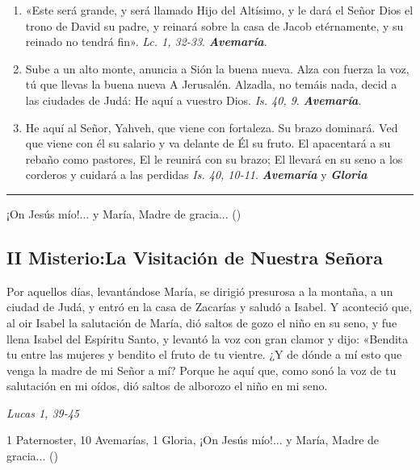 \documentclass[11pt,a4paper]{book}
\begin{document}
\begin{enumerate}
        \item «Este será grande, y será llamado Hijo del Altísimo, y le dará el Señor Dios el trono de David su padre, 
                y reinará sobre la casa de Jacob etérnamente, y su reinado no tendrá fin».  \emph{Lc. 1, 32-33}. \textbf{\emph{Avemaría}}.

        \item Sube a un alto monte, anuncia a Sión la buena nueva. Alza con fuerza la voz, tú que llevas la buena nueva A Jerusalén. Alzadla, no temáis nada, decid a las ciudades de Judá:
                He aquí a vuestro Dios. \emph{Is. 40, 9}. \textbf{\emph{Avemaría}}.

        \item He aquí al Señor, Yahveh, que viene con fortaleza. Su brazo dominará. Ved que viene con él su salario y va delante de Él su fruto. El apacentará a su rebaño como pastores,
                El le reunirá con su brazo; El llevará en su seno a los corderos y cuidará a las perdidas \emph{Is. 40, 10-11}. 
                \textbf{\emph{Avemaría}} y \textbf{\emph{Gloria}}
    \end{enumerate}

    \rule{\textwidth}{0.5pt}
    ¡On Jesús mío!... y María, Madre de gracia... ()

    \subsection*{II Misterio:La Visitación de Nuestra Señora}

    Por aquellos días, levantándose María, se dirigió presurosa a la montaña, a un ciudad de Judá, y entró en la casa de Zacarías y saludó a Isabel. 
    Y aconteció que, al oir Isabel la salutación de María, dió saltos de gozo el niño en su seno, y fue llena Isabel del Espíritu Santo, 
    y levantó la voz con gran clamor y dijo: «Bendita tu entre las mujeres y bendito el fruto de tu vientre. ¿Y de dónde a mí esto que venga la madre de mi Señor a mí? 
    Porque he aquí que, como sonó la voz de tu salutación en mi oídos, dió saltos de alborozo el niño en mi seno.
    
    \begin{flushright}
        \emph{Lucas 1, 39-45}
    \end{flushright}    

    1 Paternoster, 10 Avemarías, 1 Gloria, ¡On Jesús mío!... y María, Madre de gracia... ()
    
\end{document}
